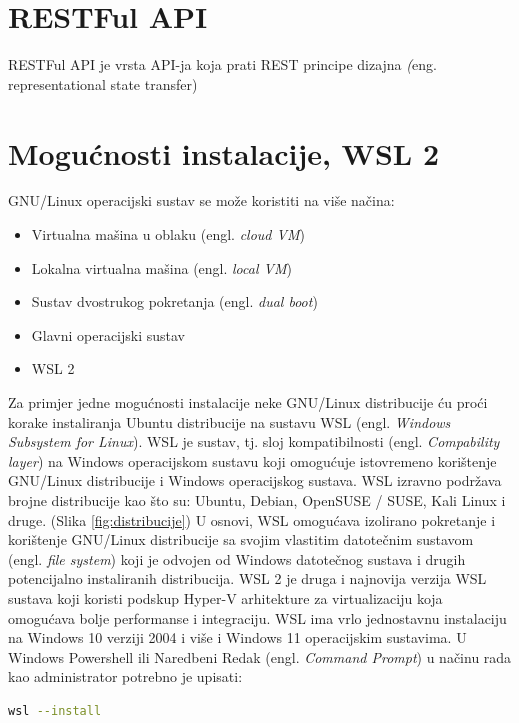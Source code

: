 \documentclass{foi}
\begin{document}
\section{RESTFul API}
RESTFul API je vrsta API-ja koja prati REST principe dizajna \textit(eng. {representational state transfer})

\section{Mogućnosti instalacije, WSL 2}
GNU/Linux operacijski sustav se može koristiti na više načina\cite{MS_howto}:
\begin{itemize}
    \item Virtualna mašina u oblaku (engl. \textit{cloud VM})
    \item Lokalna virtualna mašina (engl. \textit{local VM})
    \item Sustav dvostrukog pokretanja (engl. \textit{dual boot})
    \item Glavni operacijski sustav
    \item WSL 2
\end{itemize}
Za primjer jedne mogućnosti instalacije neke GNU/Linux distribucije ću proći korake instaliranja Ubuntu distribucije na sustavu WSL (engl. \textit{Windows Subsystem for Linux}). WSL je sustav, tj. sloj kompatibilnosti (engl. \textit{Compability layer}) na Windows operacijskom sustavu koji omogućuje istovremeno korištenje GNU/Linux distribucije i Windows operacijskog sustava.\cite{MS_whatis_wsl} WSL izravno podržava brojne distribucije kao što su: Ubuntu, Debian, OpenSUSE / SUSE, Kali Linux i druge. (Slika \ref{fig:distribucije}) U osnovi, WSL omogućava izolirano pokretanje i korištenje GNU/Linux distribucije sa svojim vlastitim datotečnim sustavom (engl. \textit{file system}) koji je odvojen od Windows datotečnog sustava i drugih potencijalno instaliranih distribucija. WSL 2 je druga i najnovija verzija WSL sustava koji koristi podskup Hyper-V arhitekture za virtualizaciju koja omogućava bolje performanse i integraciju.\cite{hyperv}
WSL ima vrlo jednostavnu instalaciju na Windows 10 verziji 2004 i više i Windows 11 operacijskim sustavima\cite{MS_install_wsl}. U Windows Powershell ili Naredbeni Redak (engl. \textit{Command Prompt}) u načinu rada kao administrator potrebno je upisati:


\begin{lstlisting}[language=bash]
wsl --install
\end{lstlisting}
\end{document}
